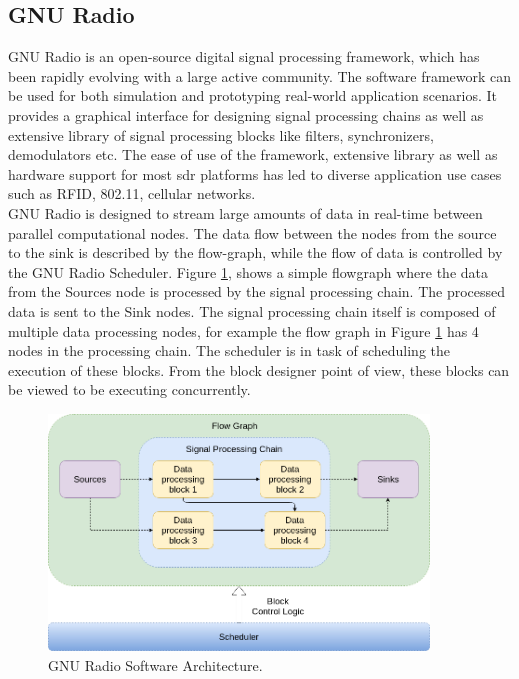 \subsection{GNU Radio}

GNU Radio is an open-source digital signal processing framework, which has been rapidly evolving with a large active community.
The software framework can be used for both simulation and prototyping real-world application scenarios. 
It  provides a graphical interface for designing signal processing chains  as well as extensive library of signal processing blocks like filters, synchronizers, demodulators etc.
The ease of use of the framework, extensive library as well as hardware support for most \ac{sdr} platforms has led to diverse application use cases such as RFID, 802.11, cellular networks.\\


GNU Radio is designed to stream large amounts of data in real-time between parallel computational nodes.
The data flow between the nodes from the source to the sink is described by the flow-graph, while the flow of data is controlled by the GNU Radio Scheduler.
Figure \ref{gnuradio_arch}, shows a simple flowgraph where the data from the Sources node is processed by the signal processing chain.
The processed data is sent to the Sink nodes.
The signal processing chain itself is composed of multiple data processing nodes, for example the flow graph in Figure \ref{gnuradio_arch} has 4 nodes in the processing chain.
The scheduler is in task of scheduling the execution of these blocks. 
From the block designer point of view, these blocks can be viewed to be executing concurrently.

\begin{figure}[h!]
\centering
\includegraphics[width=0.9\textwidth]{Figure/GNURADIO_1.png}
\caption{GNU Radio Software Architecture.}
\label{gnuradio_arch}
\end{figure}


